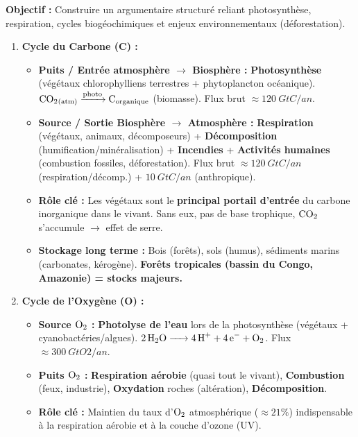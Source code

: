 \documentclass[11pt]{article}
\begin{document}
\begin{methode}
    \textbf{Objectif :} Construire un argumentaire structuré reliant photosynthèse, respiration, cycles biogéochimiques et enjeux environnementaux (déforestation).
    \begin{enumerate}
        \item \textbf{Cycle du Carbone (C) :}
            \begin{itemize}
                \item \textbf{Puits / Entrée atmosphère $\rightarrow$ Biosphère :} \textbf{Photosynthèse} (végétaux chlorophylliens terrestres + phytoplancton océanique). $\ce{CO2_{(atm)}} \xrightarrow{\text{photo}} \ce{C_{organique}}$ (biomasse). Flux brut $\approx \SI{120}{Gt C/an}$.
                \item \textbf{Source / Sortie Biosphère $\rightarrow$ Atmosphère :} \textbf{Respiration} (végétaux, animaux, décomposeurs) + \textbf{Décomposition} (humification/minéralisation) + \textbf{Incendies} + \textbf{Activités humaines} (combustion fossiles, déforestation). Flux brut $\approx \SI{120}{Gt C/an}$ (respiration/décomp.) + $\SI{10}{Gt C/an}$ (anthropique).
                \item \textbf{Rôle clé :} Les végétaux sont le \textbf{principal portail d'entrée} du carbone inorganique dans le vivant. Sans eux, pas de base trophique, $\ce{CO2}$ s'accumule $\rightarrow$ effet de serre.
                \item \textbf{Stockage long terme :} Bois (forêts), sols (humus), sédiments marins (carbonates, kérogène). \textbf{Forêts tropicales (bassin du Congo, Amazonie) = stocks majeurs.}
            \end{itemize}
        \item \textbf{Cycle de l'Oxygène (O) :}
            \begin{itemize}
                \item \textbf{Source $\ce{O2}$ :} \textbf{Photolyse de l'eau} lors de la photosynthèse (végétaux + cyanobactéries/algues). $\ce{2 H2O -> 4 H+ + 4 e- + O2}$. Flux $\approx \SI{300}{Gt O2/an}$.
                \item \textbf{Puits $\ce{O2}$ :} \textbf{Respiration aérobie} (quasi tout le vivant), \textbf{Combustion} (feux, industrie), \textbf{Oxydation} roches (altération), \textbf{Décomposition}.
                \item \textbf{Rôle clé :} Maintien du taux d'$\ce{O2}$ atmosphérique ($\approx 21\%$) indispensable à la respiration aérobie et à la couche d'ozone (UV).

\end{itemize}
\end{enumerate}
\end{methode}
\end{document}
